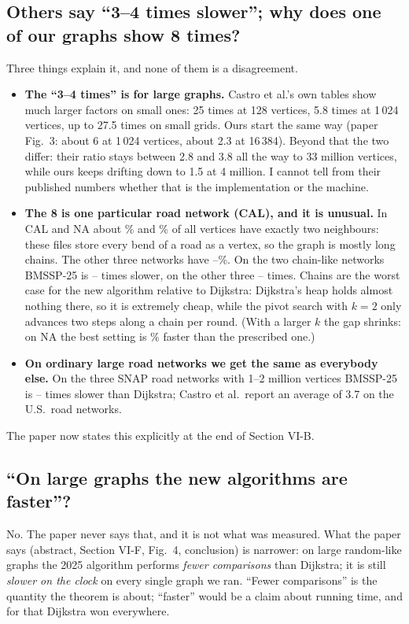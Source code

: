 \documentclass[11pt,a4paper]{article}
\newcommand{\bmA}{BMSSP-25}
\begin{document}
\subsection{Others say ``3--4 times slower''; why does one of our graphs show 8 times?}
Three things explain it, and none of them is a disagreement.
\begin{itemize}
\item \textbf{The ``3--4 times'' is for large graphs.} Castro et al.'s own tables show much larger factors on small ones: 25 times at 128 vertices, 5.8 times at 1\,024 vertices, up to 27.5 times on small grids. Ours start the same way (paper Fig.~3: about 6 at 1\,024 vertices, about 2.3 at 16\,384). Beyond that the two differ: their ratio stays between 2.8 and 3.8 all the way to 33 million vertices, while ours keeps drifting down to 1.5 at 4 million. I cannot tell from their published numbers whether that is the implementation or the machine.
\item \textbf{The 8 is one particular road network (CAL), and it is unusual.} In CAL and NA about \ChainPctA\% and \ChainPctB\% of all vertices have exactly two neighbours: these files store every bend of a road as a vertex, so the graph is mostly long chains. The other three networks have \ChainRestMin--\ChainRestMax\%. On the two chain-like networks \bmA{} is \ChainRatioMin--\ChainRatioMax{} times slower, on the other three \RestRatioMin--\RestRatioMax{} times. Chains are the worst case for the new algorithm relative to Dijkstra: Dijkstra's heap holds almost nothing there, so it is extremely cheap, while the pivot search with $k=2$ only advances two steps along a chain per round. (With a larger $k$ the gap shrinks: on NA the best setting is \ParNATwoFiveGain\% faster than the prescribed one.)
\item \textbf{On ordinary large road networks we get the same as everybody else.} On the three SNAP road networks with 1--2 million vertices \bmA{} is \SnapTimeRoadMinTwoFive--\SnapTimeRoadMaxTwoFive{} times slower than Dijkstra; Castro et al.\ report an average of 3.7 on the U.S.\ road networks.
\end{itemize}
The paper now states this explicitly at the end of Section VI-B.

\subsection{``On large graphs the new algorithms are faster''?}
No. The paper never says that, and it is not what was measured. What the paper says (abstract, Section VI-F, Fig.~4, conclusion) is narrower: on large random-like graphs the 2025 algorithm performs \emph{fewer comparisons} than Dijkstra; it is still \emph{slower on the clock} on every single graph we ran. ``Fewer comparisons'' is the quantity the theorem is about; ``faster'' would be a claim about running time, and for that Dijkstra won everywhere.
\end{document}
